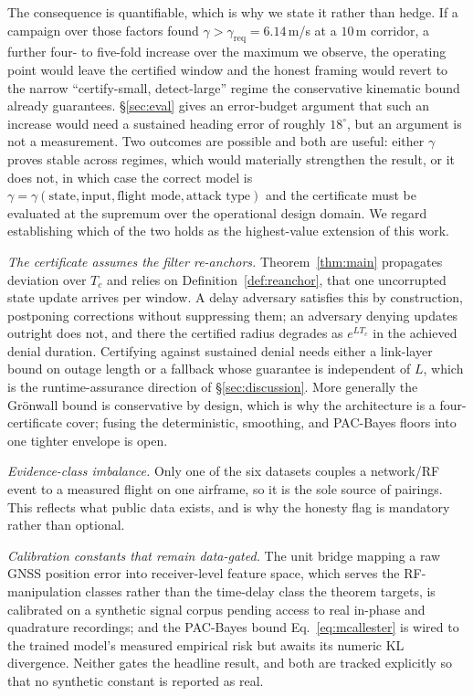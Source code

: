 The consequence is quantifiable, which is why we state it rather than hedge. If
a campaign over those factors found $\gamma>\gamma_{\mathrm{req}}=6.14$\,m/s at
a $10$\,m corridor, a further four- to five-fold increase over the maximum we
observe, the operating point would leave the certified window and the honest
framing would revert to the narrow ``certify-small, detect-large'' regime the
conservative kinematic bound already guarantees. \S\ref{sec:eval} gives an
error-budget argument that such an increase would need a sustained heading error
of roughly $18^\circ$, but an argument is not a measurement. Two outcomes are
possible and both are useful: either $\gamma$ proves stable across regimes,
which would materially strengthen the result, or it does not, in which case the
correct model is $\gamma=\gamma(\text{state},\text{input},\text{flight
mode},\text{attack type})$ and the certificate must be evaluated at the
supremum over the operational design domain. We regard establishing which of the
two holds as the highest-value extension of this work.

\emph{The certificate assumes the filter re-anchors.} Theorem~\ref{thm:main}
propagates deviation over $T_c$ and relies on Definition~\ref{def:reanchor},
that one uncorrupted state update arrives per window. A delay adversary
satisfies this by construction, postponing corrections without suppressing them;
an adversary denying updates outright does not, and there the certified radius
degrades as $e^{LT_c}$ in the achieved denial duration. Certifying against
sustained denial needs either a link-layer bound on outage length or a fallback
whose guarantee is independent of $L$, which is the runtime-assurance direction
of \S\ref{sec:discussion}. More generally the Gr\"onwall bound is conservative
by design, which is why the architecture is a four-certificate cover; fusing the
deterministic, smoothing, and PAC-Bayes floors into one tighter envelope is
open.

\emph{Evidence-class imbalance.} Only one of the six datasets couples a
network/RF event to a measured flight on one airframe, so it is the sole source
of  pairings. This reflects what public data
exists, and is why the honesty flag is mandatory rather than optional.

\emph{Calibration constants that remain data-gated.} The unit bridge mapping a
raw GNSS position error into receiver-level feature space, which serves the
RF-manipulation classes rather than the time-delay class the theorem targets, is
calibrated on a synthetic signal corpus pending access to real in-phase and
quadrature recordings; and the PAC-Bayes bound Eq.~\eqref{eq:mcallester} is
wired to the trained model's measured empirical risk but awaits its numeric KL
divergence. Neither gates the headline result, and both are tracked explicitly
so that no synthetic constant is reported as real.

